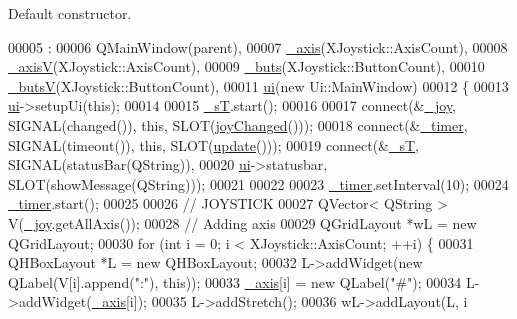 Default constructor. 


\begin{DoxyCode}
00005                                       :
00006     QMainWindow(parent),
00007     \hyperlink{a00005_a30c99d7a544f74b0650758e5cc7ead5a}{\_axis}(XJoystick::AxisCount),
00008     \hyperlink{a00005_a20f66f574ed4c96d8dfc0013e1095f15}{\_axisV}(XJoystick::AxisCount),
00009     \hyperlink{a00005_a8eaf474e1b8672f32873ed009e28ce8a}{\_buts}(XJoystick::ButtonCount),
00010     \hyperlink{a00005_a519ae4630572cb63fbd04bce12fe8e77}{\_butsV}(XJoystick::ButtonCount),
00011     \hyperlink{a00005_a35466a70ed47252a0191168126a352a5}{ui}(\textcolor{keyword}{new} Ui::MainWindow)
00012 \{
00013     \hyperlink{a00005_a35466a70ed47252a0191168126a352a5}{ui}->setupUi(\textcolor{keyword}{this});
00014     
00015     \hyperlink{a00005_a97f8ecc7ecb930b796178cef7b975013}{\_sT}.start();
00016     
00017     connect(&\hyperlink{a00005_a671f35800890e518713e1946671d8730}{\_joy}, SIGNAL(changed()), \textcolor{keyword}{this}, SLOT(\hyperlink{a00005_abb4c2d8a79c9f80010ea031366bf8226}{joyChanged}()));
00018     connect(&\hyperlink{a00005_a254b03b878cfda75c1c411a2f8568d33}{\_timer}, SIGNAL(timeout()), \textcolor{keyword}{this}, SLOT(\hyperlink{a00005_a128f71880d4b9683149023fc46fcc9f8}{update}()));
00019     connect(&\hyperlink{a00005_a97f8ecc7ecb930b796178cef7b975013}{\_sT}, SIGNAL(statusBar(QString)), 
00020             \hyperlink{a00005_a35466a70ed47252a0191168126a352a5}{ui}->statusbar, SLOT(showMessage(QString)));
00021     
00022     
00023     \hyperlink{a00005_a254b03b878cfda75c1c411a2f8568d33}{\_timer}.setInterval(10);
00024     \hyperlink{a00005_a254b03b878cfda75c1c411a2f8568d33}{\_timer}.start();
00025     
00026     \textcolor{comment}{// JOYSTICK}
00027     QVector< QString > V(\hyperlink{a00005_a671f35800890e518713e1946671d8730}{\_joy}.getAllAxis());
00028     \textcolor{comment}{// Adding axis}
00029     QGridLayout *wL = \textcolor{keyword}{new} QGridLayout;
00030     \textcolor{keywordflow}{for} (\textcolor{keywordtype}{int} i = 0; i < XJoystick::AxisCount; ++i) \{
00031         QHBoxLayout *L = \textcolor{keyword}{new} QHBoxLayout;
00032         L->addWidget(\textcolor{keyword}{new} QLabel(V[i].append(\textcolor{stringliteral}{":"}), \textcolor{keyword}{this}));
00033         \hyperlink{a00005_a30c99d7a544f74b0650758e5cc7ead5a}{\_axis}[i] = \textcolor{keyword}{new} QLabel(\textcolor{stringliteral}{"#"});
00034         L->addWidget(\hyperlink{a00005_a30c99d7a544f74b0650758e5cc7ead5a}{\_axis}[i]);
00035         L->addStretch();
00036         wL->addLayout(L, i%

\end{DoxyCode}
